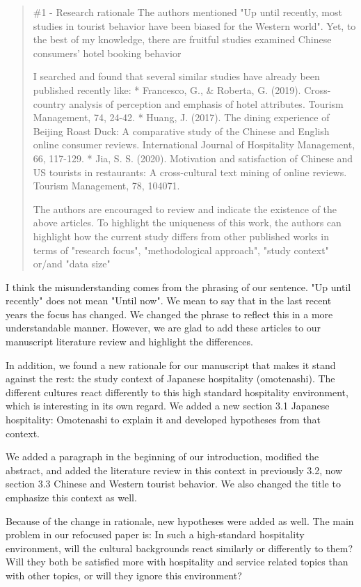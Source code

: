 \documentclass{letter}
\begin{document}
\begin{quotation}
\#1 - Research rationale
The authors mentioned "Up until recently, most studies in tourist behavior have been biased for the Western world". Yet, to the best of my knowledge, there are fruitful studies examined Chinese consumers' hotel booking behavior

I searched and found that several similar studies have already been published recently like:
*  Francesco, G., \& Roberta, G. (2019). Cross-country analysis of perception and emphasis of hotel attributes. Tourism Management, 74, 24-42.
*  Huang, J. (2017). The dining experience of Beijing Roast Duck: A comparative study of the Chinese and English online consumer reviews. International Journal of Hospitality Management, 66, 117-129.
*  Jia, S. S. (2020). Motivation and satisfaction of Chinese and US tourists in restaurants: A cross-cultural text mining of online reviews. Tourism Management, 78, 104071.

The authors are encouraged to review and indicate the existence of the above articles. To highlight the uniqueness of this work, the authors can highlight how the current study differs from other published works in terms of "research focus", "methodological approach", "study context" or/and "data size"
\end{quotation}


I think the misunderstanding comes from the phrasing of our sentence. "Up until recently" does not mean "Until now". We mean to say that in the last recent years the focus has changed. We changed the phrase to reflect this in a more understandable manner. However, we are glad to add these articles to our manuscript literature review and highlight the differences.

In addition, we found a new rationale for our manuscript that makes it stand against the rest: the study context of Japanese hospitality (omotenashi). The different cultures react differently to this high standard hospitality environment, which is interesting in its own regard. We added a new section 3.1  Japanese hospitality: Omotenashi to explain it and developed hypotheses from that context.

We added a paragraph in the beginning of our introduction, modified the abstract, and added the literature review in this context in previously 3.2, now section 3.3 Chinese and Western tourist behavior. We also changed the title to emphasize this context as well. 

Because of the change in rationale, new hypotheses were added as well. The main problem in our refocused paper is: In such a high-standard hospitality environment, will the cultural backgrounds react similarly or differently to them? Will they both be satisfied more with hospitality and service related topics than with other topics, or will they ignore this environment?
\end{document}
